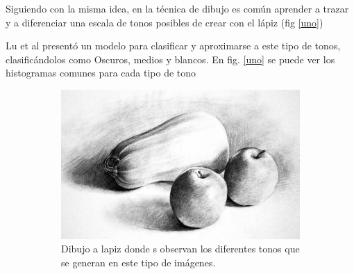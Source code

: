 \documentclass[letterpaper, 10 pt, conference]{ieeeconf}  %
\begin{document}
Siguiendo con la misma idea, en la técnica de dibujo es común aprender a trazar y a diferenciar una escala de tonos posibles de crear con el lápiz (fig \ref{uno})

Lu et al\cite{lu} presentó un modelo para clasificar y aproximarse a este tipo de tonos, clasificándolos como Oscuros, medios y blancos.
En fig. \ref{uno} se puede ver los histogramas comunes para cada tipo de tono


\begin{figure}
\centering
    \begin{subfigure}{0.45\linewidth}
\includegraphics[width=\linewidth, scale=0.05]{images/tone_im.png} 
    \caption{Dibujo a lapiz donde s observan los diferentes tonos que se generan en este tipo de imágenes.}
\label{fig:1a}
    \end{subfigure}\hfill
    \begin{subfigure}{0.45\linewidth}

\end{subfigure}
\end{figure}
\end{document}
